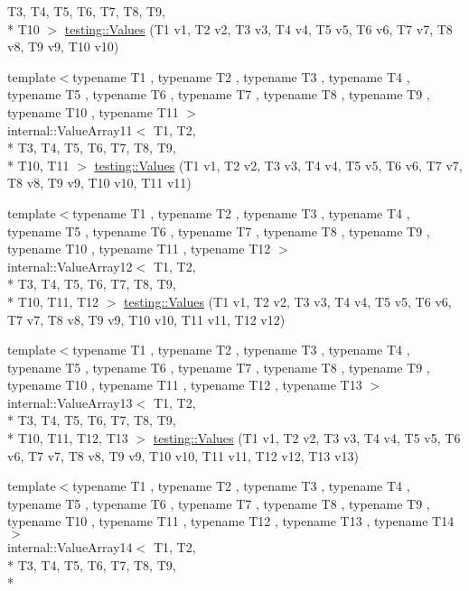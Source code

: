 \begin{DoxyCompactItemize}
T3, T4, T5, T6, T7, T8, T9, \\*
T10 $>$ \hyperlink{namespacetesting_a2948b0215fce80155fdbad4e3608f4cd}{testing\-::\-Values} (T1 v1, T2 v2, T3 v3, T4 v4, T5 v5, T6 v6, T7 v7, T8 v8, T9 v9, T10 v10)
\item 
{\footnotesize template$<$typename T1 , typename T2 , typename T3 , typename T4 , typename T5 , typename T6 , typename T7 , typename T8 , typename T9 , typename T10 , typename T11 $>$ }\\internal\-::\-Value\-Array11$<$ T1, T2, \\*
T3, T4, T5, T6, T7, T8, T9, \\*
T10, T11 $>$ \hyperlink{namespacetesting_a4aaae77b8404038ed5f3bf56cccdb940}{testing\-::\-Values} (T1 v1, T2 v2, T3 v3, T4 v4, T5 v5, T6 v6, T7 v7, T8 v8, T9 v9, T10 v10, T11 v11)
\item 
{\footnotesize template$<$typename T1 , typename T2 , typename T3 , typename T4 , typename T5 , typename T6 , typename T7 , typename T8 , typename T9 , typename T10 , typename T11 , typename T12 $>$ }\\internal\-::\-Value\-Array12$<$ T1, T2, \\*
T3, T4, T5, T6, T7, T8, T9, \\*
T10, T11, T12 $>$ \hyperlink{namespacetesting_a03e7f9611794732bb030c53365dc6c86}{testing\-::\-Values} (T1 v1, T2 v2, T3 v3, T4 v4, T5 v5, T6 v6, T7 v7, T8 v8, T9 v9, T10 v10, T11 v11, T12 v12)
\item 
{\footnotesize template$<$typename T1 , typename T2 , typename T3 , typename T4 , typename T5 , typename T6 , typename T7 , typename T8 , typename T9 , typename T10 , typename T11 , typename T12 , typename T13 $>$ }\\internal\-::\-Value\-Array13$<$ T1, T2, \\*
T3, T4, T5, T6, T7, T8, T9, \\*
T10, T11, T12, T13 $>$ \hyperlink{namespacetesting_aa13a09e043383c947042ba726d25d47c}{testing\-::\-Values} (T1 v1, T2 v2, T3 v3, T4 v4, T5 v5, T6 v6, T7 v7, T8 v8, T9 v9, T10 v10, T11 v11, T12 v12, T13 v13)
\item 
{\footnotesize template$<$typename T1 , typename T2 , typename T3 , typename T4 , typename T5 , typename T6 , typename T7 , typename T8 , typename T9 , typename T10 , typename T11 , typename T12 , typename T13 , typename T14 $>$ }\\internal\-::\-Value\-Array14$<$ T1, T2, \\*
T3, T4, T5, T6, T7, T8, T9, \\*

\end{DoxyCompactItemize}
